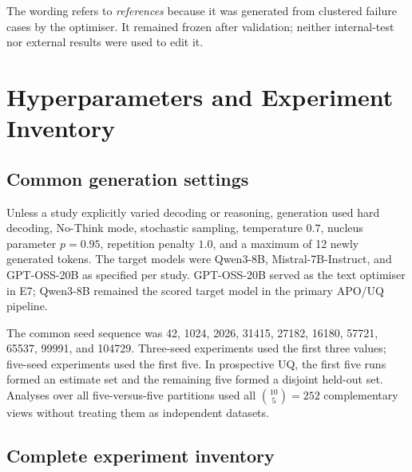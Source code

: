 \documentclass[11pt,twoside,a4paper]{report}
\begin{document}
The wording refers to \emph{references} because it was generated from clustered
failure cases by the optimiser.  It remained frozen after validation; neither
internal-test nor external results were used to edit it.


\chapter{Hyperparameters and Experiment Inventory}
\label{app:hyperparameters}

\section{Common generation settings}

Unless a study explicitly varied decoding or reasoning, generation used hard
decoding, No-Think mode, stochastic sampling, temperature $0.7$, nucleus
parameter $p=0.95$, repetition penalty $1.0$, and a maximum of 12 newly
generated tokens.  The target models were Qwen3-8B, Mistral-7B-Instruct, and
GPT-OSS-20B as specified per study.  GPT-OSS-20B served as the text optimiser
in E7; Qwen3-8B remained the scored target model in the primary APO/UQ pipeline.

The common seed sequence was 42, 1024, 2026, 31415, 27182, 16180, 57721,
65537, 99991, and 104729.  Three-seed experiments used the first three values;
five-seed experiments used the first five.  In prospective UQ, the first five
runs formed an estimate set and the remaining five formed a disjoint held-out
set.  Analyses over all five-versus-five partitions used all
$\binom{10}{5}=252$ complementary views without treating them as independent
datasets.

\section{Complete experiment inventory}
\end{document}
